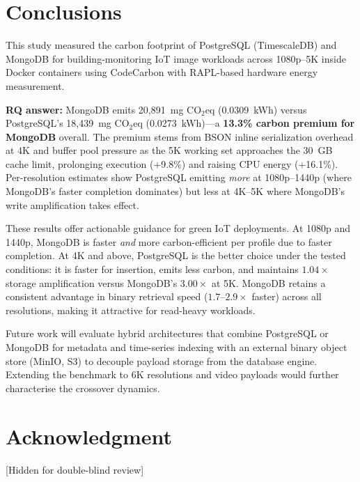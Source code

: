 \documentclass[conference]{IEEEtran}
\begin{document}
\section{Conclusions}
\label{sec:conclusions}

This study measured the carbon footprint of PostgreSQL (TimescaleDB) and MongoDB for building-monitoring IoT image workloads across 1080p--5K inside Docker containers using CodeCarbon with RAPL-based hardware energy measurement.

\textbf{RQ answer:} MongoDB emits 20,891~mg CO$_2$eq (0.0309~kWh) versus PostgreSQL's 18,439~mg CO$_2$eq (0.0273~kWh)---a \textbf{13.3\% carbon premium for MongoDB} overall. The premium stems from BSON inline serialization overhead at 4K and buffer pool pressure as the 5K working set approaches the 30~GB cache limit, prolonging execution (+9.8\%) and raising CPU energy (+16.1\%). Per-resolution estimates show PostgreSQL emitting \emph{more} at 1080p--1440p (where MongoDB's faster completion dominates) but less at 4K--5K where MongoDB's write amplification takes effect.

These results offer actionable guidance for green IoT deployments. At 1080p and 1440p, MongoDB is faster \emph{and} more carbon-efficient per profile due to faster completion. At 4K and above, PostgreSQL is the better choice under the tested conditions: it is faster for insertion, emits less carbon, and maintains $1.04\times$ storage amplification versus MongoDB's $3.00\times$ at 5K. MongoDB retains a consistent advantage in binary retrieval speed ($1.7$--$2.9\times$ faster) across all resolutions, making it attractive for read-heavy workloads.

Future work will evaluate hybrid architectures that combine PostgreSQL or MongoDB for metadata and time-series indexing with an external binary object store (MinIO, S3) to decouple payload storage from the database engine. Extending the benchmark to 6K resolutions and video payloads would further characterise the crossover dynamics.


\section*{Acknowledgment}
[Hidden for double-blind review]




\end{document}
